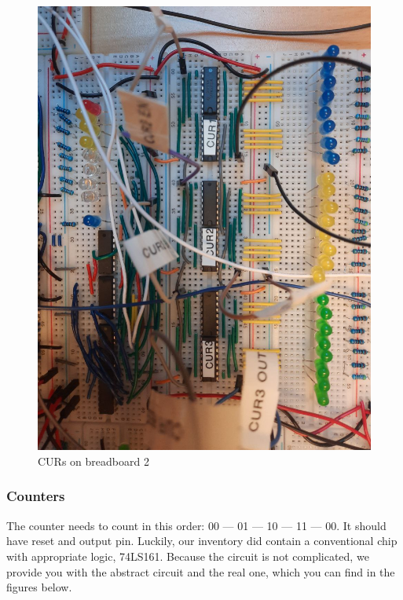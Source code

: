 \begin{figure}[H]
\begin{minipage}[b]{0.4\textwidth}
		\includegraphics[width=\textwidth]{img/curs}
		\caption{CURs on breadboard 2}
	\end{minipage}
\end{figure}


\subsubsection{Counters} \label{sec:implementation:control_unit:counters}
The counter needs to count in this order: 00 --- 01 --- 10 --- 11 --- 00. It should have reset and output pin. Luckily, our inventory did contain a conventional chip with appropriate logic, 74LS161. Because the circuit is not complicated, we provide you with the abstract circuit and the real one, which you can find in the figures below.

